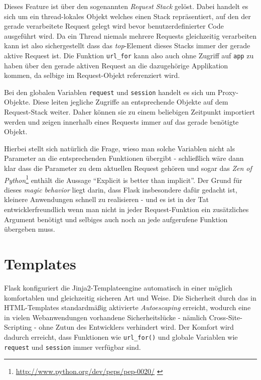 Dieses Feature ist über den sogenannten \emph{Request Stack} gelöst. Dabei handelt es sich um ein
thread-lokales Objekt welches einen Stack repräsentiert, auf den der gerade verarbeitete Request
gelegt wird bevor benutzerdefinierter Code ausgeführt wird. Da ein Thread niemals mehrere Requests
gleichzeitig verarbeiten kann ist also sichergestellt dass das \emph{top}-Element dieses Stacks
immer der gerade aktive Request ist. Die Funktion \lstinline{url_for} kann also auch ohne Zugriff
auf \lstinline{app} zu haben über den gerade aktiven Request an die dazugehörige Applikation kommen,
da selbige im Request-Objekt referenziert wird.

Bei den globalen Variablen \lstinline{request} und \lstinline{session} handelt es sich um
Proxy-Objekte. Diese leiten jegliche Zugriffe an entsprechende Objekte auf dem Request-Stack weiter.
Daher können sie zu einem beliebigen Zeitpunkt importiert werden und zeigen innerhalb eines Requests
immer auf das gerade benötigte Objekt.

Hierbei stellt sich natürlich die Frage, wieso man solche Variablen nicht als Parameter an die
entsprechenden Funktionen übergibt - schließlich wäre dann klar dass die Parameter zu dem aktuellen
Request gehören und sogar das \emph{Zen of
Python}\footnote{\href{http://www.python.org/dev/peps/pep-0020/}{http://www.python.org/dev/peps/pep-0020/}
\citep{zenofpython}}
enthält die Aussage \enquote{Explicit is better than implicit}. Der Grund für dieses \emph{magic
behavior} liegt darin, dass Flask insbesondere dafür gedacht ist, kleinere Anwendungen schnell zu
realisieren - und es ist in der Tat entwicklerfreundlich wenn man nicht in jeder Request-Funktion
ein zusätzliches Argument benötigt und selbiges auch noch an jede aufgerufene Funktion übergeben
muss.

\section{Templates}

Flask konfiguriert die Jinja2-Templateengine automatisch in einer möglich komfortablen und
gleichzeitig sicheren Art und Weise. Die Sicherheit durch das in HTML-Templates standardmäßig
aktivierte \emph{Autoescaping} erreicht, wodurch eine in vielen Webanwendungen vorhandene
Sicherheitslücke - nämlich Cross-Site-Scripting - ohne Zutun des Entwicklers verhindert wird. Der
Komfort wird dadurch erreicht, dass Funktionen wie \lstinline{url_for()} und globale Variablen wie
\lstinline{request} und \lstinline{session} immer verfügbar sind.

